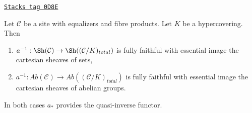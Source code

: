\begin{lemma}
\label{spaces-simplicial-lemma-hypercovering-descent-sheaves}
\href{https://stacks.math.columbia.edu/tag/0D8E}{\texttt{Stacks tag 0D8E}}

Let $\mathcal{C}$ be a site with equalizers and fibre products.
Let $K$ be a hypercovering. Then
\begin{enumerate}
\item $a^{-1} : \Sh(\mathcal{C}) \to \Sh((\mathcal{C}/K)_{total})$
is fully faithful with essential image the cartesian sheaves of sets,
\item $a^{-1} : \textit{Ab}(\mathcal{C}) \to
\textit{Ab}((\mathcal{C}/K)_{total})$
is fully faithful with essential image the cartesian sheaves
of abelian groups.
\end{enumerate}
In both cases $a_*$ provides the quasi-inverse functor.
\end{lemma}

